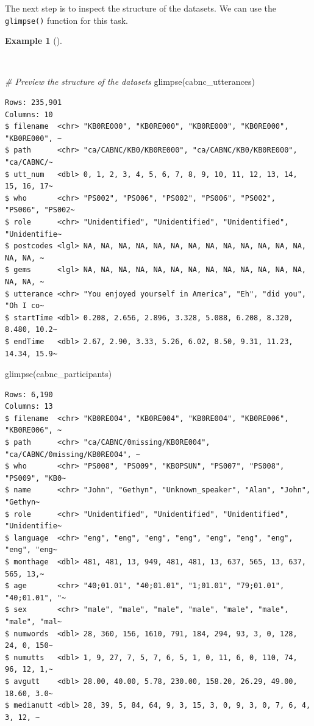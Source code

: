 \documentclass[
  letterpaper,
]{latex/krantz}
\newenvironment{Shaded}{\begin{snugshade}}{\end{snugshade}}
\newcommand{\CommentTok}[1]{\textcolor[rgb]{0.00,0.00,0.00}{\textit{#1}}}
\newcommand{\FunctionTok}[1]{\textcolor[rgb]{0.00,0.00,0.00}{#1}}
\newcommand{\NormalTok}[1]{\textcolor[rgb]{0.00,0.00,0.00}{#1}}
\theoremstyle{definition}
\newtheorem{example}{Example}[chapter]
\theoremstyle{remark}
\begin{document}
The next step is to inspect the structure of the datasets. We can use
the \texttt{glimpse()} function for this task.

\begin{example}[]\protect\hypertarget{exm-curate-cabnc-glimpse}{}\label{exm-curate-cabnc-glimpse}

~

\begin{Shaded}
\begin{Highlighting}[]
\CommentTok{\# Preview the structure of the datasets}
\FunctionTok{glimpse}\NormalTok{(cabnc\_utterances)}
\end{Highlighting}
\end{Shaded}

\begin{verbatim}
Rows: 235,901
Columns: 10
$ filename  <chr> "KB0RE000", "KB0RE000", "KB0RE000", "KB0RE000", "KB0RE000", ~
$ path      <chr> "ca/CABNC/KB0/KB0RE000", "ca/CABNC/KB0/KB0RE000", "ca/CABNC/~
$ utt_num   <dbl> 0, 1, 2, 3, 4, 5, 6, 7, 8, 9, 10, 11, 12, 13, 14, 15, 16, 17~
$ who       <chr> "PS002", "PS006", "PS002", "PS006", "PS002", "PS006", "PS002~
$ role      <chr> "Unidentified", "Unidentified", "Unidentified", "Unidentifie~
$ postcodes <lgl> NA, NA, NA, NA, NA, NA, NA, NA, NA, NA, NA, NA, NA, NA, NA, ~
$ gems      <lgl> NA, NA, NA, NA, NA, NA, NA, NA, NA, NA, NA, NA, NA, NA, NA, ~
$ utterance <chr> "You enjoyed yourself in America", "Eh", "did you", "Oh I co~
$ startTime <dbl> 0.208, 2.656, 2.896, 3.328, 5.088, 6.208, 8.320, 8.480, 10.2~
$ endTime   <dbl> 2.67, 2.90, 3.33, 5.26, 6.02, 8.50, 9.31, 11.23, 14.34, 15.9~
\end{verbatim}

\begin{Shaded}
\begin{Highlighting}[]
\FunctionTok{glimpse}\NormalTok{(cabnc\_participants)}
\end{Highlighting}
\end{Shaded}

\begin{verbatim}
Rows: 6,190
Columns: 13
$ filename  <chr> "KB0RE004", "KB0RE004", "KB0RE004", "KB0RE006", "KB0RE006", ~
$ path      <chr> "ca/CABNC/0missing/KB0RE004", "ca/CABNC/0missing/KB0RE004", ~
$ who       <chr> "PS008", "PS009", "KB0PSUN", "PS007", "PS008", "PS009", "KB0~
$ name      <chr> "John", "Gethyn", "Unknown_speaker", "Alan", "John", "Gethyn~
$ role      <chr> "Unidentified", "Unidentified", "Unidentified", "Unidentifie~
$ language  <chr> "eng", "eng", "eng", "eng", "eng", "eng", "eng", "eng", "eng~
$ monthage  <dbl> 481, 481, 13, 949, 481, 481, 13, 637, 565, 13, 637, 565, 13,~
$ age       <chr> "40;01.01", "40;01.01", "1;01.01", "79;01.01", "40;01.01", "~
$ sex       <chr> "male", "male", "male", "male", "male", "male", "male", "mal~
$ numwords  <dbl> 28, 360, 156, 1610, 791, 184, 294, 93, 3, 0, 128, 24, 0, 150~
$ numutts   <dbl> 1, 9, 27, 7, 5, 7, 6, 5, 1, 0, 11, 6, 0, 110, 74, 96, 12, 1,~
$ avgutt    <dbl> 28.00, 40.00, 5.78, 230.00, 158.20, 26.29, 49.00, 18.60, 3.0~
$ medianutt <dbl> 28, 39, 5, 84, 64, 9, 3, 15, 3, 0, 9, 3, 0, 7, 6, 4, 3, 12, ~
\end{verbatim}

\end{example}
\end{document}
